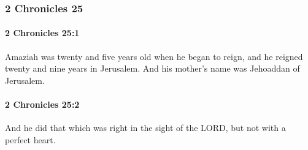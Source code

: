 	\subsubsection{2 Chronicles 25} %
		\label{2CHRONICLES-25}

		\paragraph{2 Chronicles 25:1} %
			\label{2CHRONICLES-25-1}

			Amaziah was twenty and five years old when he began to reign, and he reigned twenty and nine years in Jerusalem. And his mother's name was Jehoaddan of Jerusalem.


		\paragraph{2 Chronicles 25:2} %
			\label{2CHRONICLES-25-2}

			And he did that which was right in the sight of the LORD, but not with a perfect heart.

